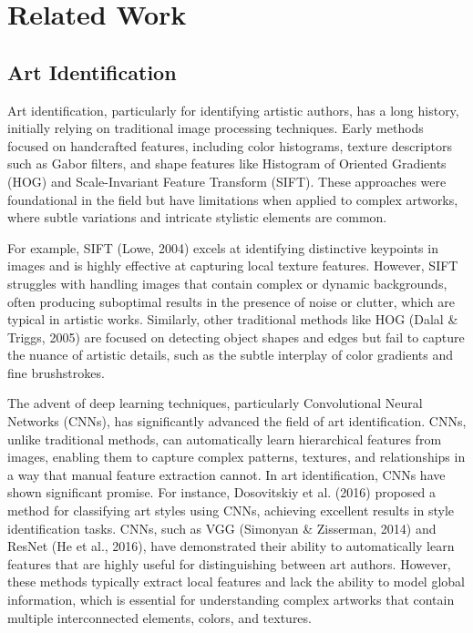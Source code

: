 \section{Related Work}
\subsection{Art Identification}

Art identification, particularly for identifying artistic authors, has a long history, initially relying on traditional image processing techniques. Early methods focused on handcrafted features, including color histograms, texture descriptors such as Gabor filters, and shape features like Histogram of Oriented Gradients (HOG) and Scale-Invariant Feature Transform (SIFT). These approaches were foundational in the field but have limitations when applied to complex artworks, where subtle variations and intricate stylistic elements are common.

For example, SIFT (Lowe, 2004) excels at identifying distinctive keypoints in images and is highly effective at capturing local texture features\cite{lowe2004distinctive}. However, SIFT struggles with handling images that contain complex or dynamic backgrounds, often producing suboptimal results in the presence of noise or clutter, which are typical in artistic works. Similarly, other traditional methods like HOG (Dalal \& Triggs, 2005) are focused on detecting object shapes and edges but fail to capture the nuance of artistic details, such as the subtle interplay of color gradients and fine brushstrokes.

The advent of deep learning techniques, particularly Convolutional Neural Networks (CNNs), has significantly advanced the field of art identification\cite{cetinic2018fine}. CNNs, unlike traditional methods, can automatically learn hierarchical features from images, enabling them to capture complex patterns, textures, and relationships in a way that manual feature extraction cannot. In art identification, CNNs have shown significant promise. For instance, Dosovitskiy et al. (2016) proposed a method for classifying art styles using CNNs, achieving excellent results in style identification tasks. CNNs, such as VGG (Simonyan \& Zisserman, 2014)\cite{simonyan2014very} and ResNet (He et al., 2016)\cite{he2016deep}, have demonstrated their ability to automatically learn features that are highly useful for distinguishing between art authors. However, these methods typically extract local features and lack the ability to model global information, which is essential for understanding complex artworks that contain multiple interconnected elements, colors, and textures.

